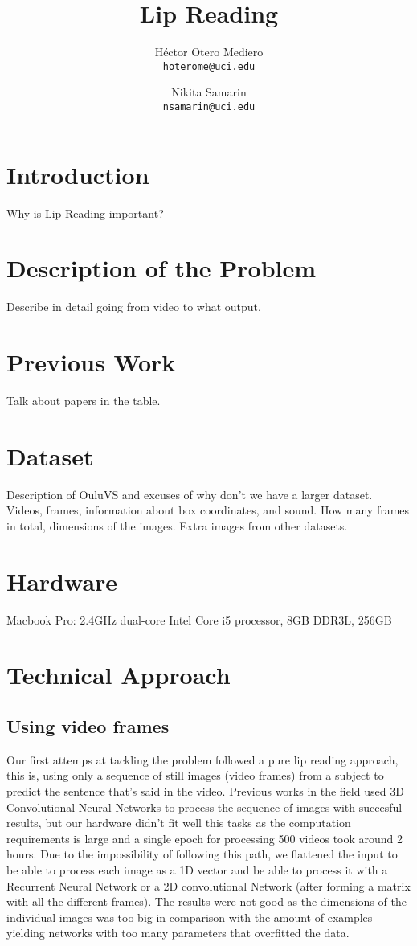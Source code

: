 \documentclass{article}[10pt]
\author{
  Héctor Otero Mediero\\      \texttt{hoterome@uci.edu}
  \and
  Nikita Samarin\\      \texttt{nsamarin@uci.edu}
}
\title{Lip Reading}
\begin{document}
\maketitle

\begin{multicols}{2}

\section{Introduction}
Why is Lip Reading important?
\section{Description of the Problem}
Describe in detail going from video to what output.
\section{Previous Work}
Talk about papers in the table.
\section{Dataset}
Description of OuluVS and excuses of why don't we have a larger dataset.
Videos, frames, information about box coordinates, and sound.
How many frames in total, dimensions of the images.
Extra images from other datasets.
\section{Hardware}
Macbook Pro: 2.4GHz dual-core Intel Core i5 processor, 8GB DDR3L, 256GB
\section{Technical Approach}
\subsection{Using video frames}

Our first attemps at tackling the problem followed a pure lip reading approach,
this is, using only a sequence of still images (video frames) from a subject to
predict the sentence that's said in the video. Previous works in the field used
3D Convolutional Neural Networks to process the sequence of images with
succesful results, but our hardware didn't fit well this tasks as the
computation requirements is large and a single epoch for processing 500 videos
took around 2 hours. Due to the impossibility of following this path, we
flattened the input to be able to process each image as a 1D vector and be able
to process it with a Recurrent Neural Network or a 2D convolutional Network
(after forming a matrix with all the different frames). The results were not
good as the dimensions of the individual images was too big in comparison with
the amount of examples yielding networks with too many parameters that
overfitted the data.


\end{multicols}
\end{document}
